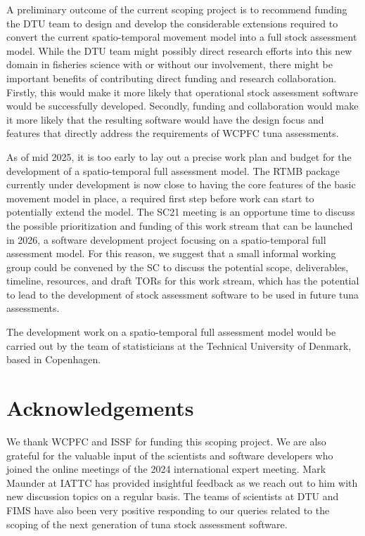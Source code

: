 \documentclass{SCreport}
\begin{document}
A preliminary outcome of the current scoping project is to recommend funding the
DTU team to design and develop the considerable extensions required to convert
the current spatio-temporal movement model into a full stock assessment model.
While the DTU team might possibly direct research efforts into this new domain
in fisheries science with or without our involvement, there might be important
benefits of contributing direct funding and research collaboration. Firstly,
this would make it more likely that operational stock assessment software would
be successfully developed. Secondly, funding and collaboration would make it
more likely that the resulting software would have the design focus and features
that directly address the requirements of WCPFC tuna assessments.

As of mid 2025, it is too early to lay out a precise work plan and budget for
the development of a spatio-temporal full assessment model. The RTMB package
currently under development is now close to having the core features of the
basic movement model in place, a required first step before work can start to
potentially extend the model. The SC21 meeting is an opportune time to discuss
the possible prioritization and funding of this work stream that can be launched
in 2026, a software development project focusing on a spatio-temporal full
assessment model. For this reason, we suggest that a small informal working
group could be convened by the SC to discuss the potential scope, deliverables,
timeline, resources, and draft TORs for this work stream, which has the
potential to lead to the development of stock assessment software to be used in
future tuna assessments.

The development work on a spatio-temporal full assessment model would be carried
out by the team of statisticians at the Technical University of Denmark, based
in Copenhagen.

\section{Acknowledgements}

We thank WCPFC and ISSF for funding this scoping project. We are also grateful
for the valuable input of the scientists and software developers who joined the
online meetings of the 2024 international expert meeting. Mark Maunder at IATTC
has provided insightful feedback as we reach out to him with new discussion
topics on a regular basis. The teams of scientists at DTU and FIMS have also
been very positive responding to our queries related to the scoping of the next
generation of tuna stock assessment software.
\end{document}
